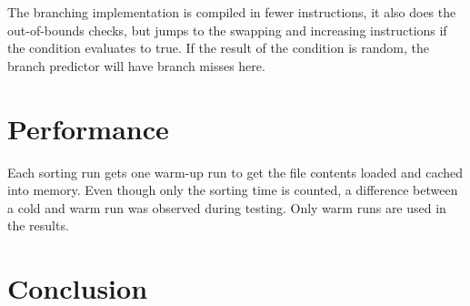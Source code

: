 \documentclass[a4paper,10pt]{article}
\begin{document}
The branching implementation is compiled in fewer instructions, it also does the
out-of-bounds checks, but jumps to the swapping and increasing instructions if the
condition evaluates to true. If the result of the condition is random, the branch
predictor will have branch misses here.

\section{Performance}

Each sorting run gets one warm-up run to get the file contents loaded
and cached into memory. Even though only the sorting time is counted, a
difference between a cold and warm run was observed during testing.
Only warm runs are used in the results.

\section{Conclusion}
\end{document}
